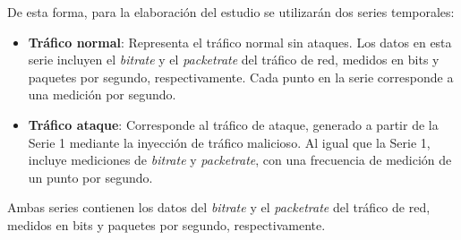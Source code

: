 De esta forma, para la elaboración del estudio se utilizarán dos series temporales: 
\begin{itemize}
    \item \textbf{Tráfico normal}: Representa el tráfico normal sin ataques. Los datos en esta serie incluyen el \textit{bitrate} y el \textit{packetrate} del tráfico de red, medidos en bits y paquetes por segundo, respectivamente. Cada punto en la serie corresponde a una medición por segundo.
    \item \textbf{Tráfico ataque}: Corresponde al tráfico de ataque, generado a partir de la Serie 1 mediante la inyección de tráfico malicioso. Al igual que la Serie 1, incluye mediciones de \textit{bitrate} y \textit{packetrate}, con una frecuencia de medición de un punto por segundo.
\end{itemize}
Ambas series contienen los datos del \textit{bitrate} y el \textit{packetrate} del tráfico de red, medidos en bits y paquetes por segundo, respectivamente. 
